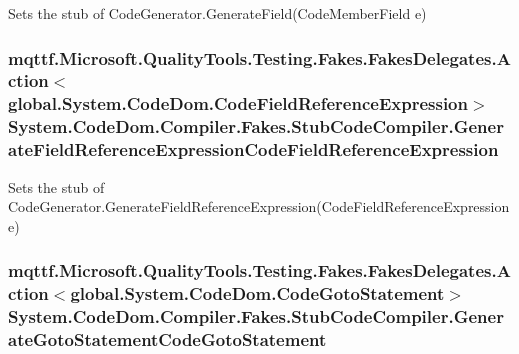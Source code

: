 Sets the stub of Code\-Generator.\-Generate\-Field(\-Code\-Member\-Field e)

\hypertarget{class_system_1_1_code_dom_1_1_compiler_1_1_fakes_1_1_stub_code_compiler_a0d0291ea2c5c41eb5fa4366dcb0aac5e}{
\subsubsection[{Generate\-Field\-Reference\-Expression\-Code\-Field\-Reference\-Expression}]{\setlength{\rightskip}{0pt plus 5cm}mqttf.\-Microsoft.\-Quality\-Tools.\-Testing.\-Fakes.\-Fakes\-Delegates.\-Action$<$global.\-System.\-Code\-Dom.\-Code\-Field\-Reference\-Expression$>$ System.\-Code\-Dom.\-Compiler.\-Fakes.\-Stub\-Code\-Compiler.\-Generate\-Field\-Reference\-Expression\-Code\-Field\-Reference\-Expression}}\label{class_system_1_1_code_dom_1_1_compiler_1_1_fakes_1_1_stub_code_compiler_a0d0291ea2c5c41eb5fa4366dcb0aac5e}


Sets the stub of Code\-Generator.\-Generate\-Field\-Reference\-Expression(\-Code\-Field\-Reference\-Expression e)

\hypertarget{class_system_1_1_code_dom_1_1_compiler_1_1_fakes_1_1_stub_code_compiler_aa2cfaadeb51248b87045e78e83e4f959}{
\subsubsection[{Generate\-Goto\-Statement\-Code\-Goto\-Statement}]{\setlength{\rightskip}{0pt plus 5cm}mqttf.\-Microsoft.\-Quality\-Tools.\-Testing.\-Fakes.\-Fakes\-Delegates.\-Action$<$global.\-System.\-Code\-Dom.\-Code\-Goto\-Statement$>$ System.\-Code\-Dom.\-Compiler.\-Fakes.\-Stub\-Code\-Compiler.\-Generate\-Goto\-Statement\-Code\-Goto\-Statement}}\label{class_system_1_1_code_dom_1_1_compiler_1_1_fakes_1_1_stub_code_compiler_aa2cfaadeb51248b87045e78e83e4f959}


